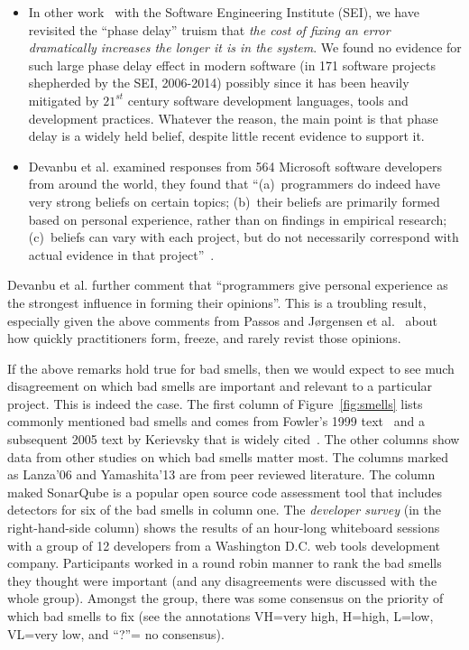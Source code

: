 \documentclass[twocolumn,5p]{elsarticle}
\newcommand{\bi}{\begin{itemize}[leftmargin=0.4cm]}
\newcommand{\ei}{\end{itemize}}
\newcommand{\fig}[1]{Figure~\ref{fig:#1}}
\theoremstyle{break}
\begin{document}
	\bi
	\item
	In other work~\cite{me16phase} with the Software Engineering Institute (SEI), we have revisited
	the ``phase delay'' truism that {\em the cost of fixing an error dramatically increases the longer it is in the system}. 
	We found no evidence for such large   phase delay effect in modern
	software (in 171 software projects shepherded
	by the SEI, 2006-2014) possibly since it has been  heavily mitigated by $21^{st}$ century software development languages, tools and development practices. 
	Whatever the reason, the main point  is that phase delay is a widely
	held belief, despite little recent evidence to support it.
	\item
	Devanbu et al. examined responses from 564 Microsoft software developers from around
	the world, they found that  ``(a)~programmers do indeed have very
	strong beliefs on certain topics; (b)~their beliefs are primarily formed
	based on personal experience, rather than on findings in empirical
	research; (c)~beliefs can vary with each project, but do not necessarily
	correspond with actual evidence in that project''~\cite{prem16}.
	\ei
	Devanbu et al. further  comment that ``programmers give personal experience
	as the strongest influence in forming their opinions''. This is a troubling
	result, especially given the above comments from Passos and  J{\o}rgensen et al.~\cite{passos11,jorgensen09} about how quickly practitioners form, freeze, and rarely revist those opinions.
	
	
	
	
	
	If the above remarks hold true for bad smells, then we would expect
	to see much disagreement on which bad smells are important and relevant
	to  a particular project. This is indeed the case.
	The first column of \fig{smells} 
	lists  commonly mentioned bad smells and comes from Fowler's 1999 text~\cite{fowler99} and a subsequent 2005 text by Kerievsky that is widely cited~\cite{Kerievsky2005}.
	The other
	columns show data from other studies on which bad smells matter most.
	The columns marked as Lanza'06 and Yamashita'13 are from peer reviewed literature. The column maked SonarQube is a popular open source
	code assessment tool that includes detectors for six of the bad smells
	in column one. 
	The {\em developer survey} (in the right-hand-side column) shows the results of an hour-long whiteboard sessions with a group of 12 developers from a Washington
	D.C. web tools development company. Participants
	worked in a round robin manner to rank the bad smells they thought were
	important (and any disagreements were discussed with the whole group).
	Amongst the group, there was  some
	consensus on  the priority of which bad smells to fix
	(see the annotations VH=very high,
	H=high, L=low, VL=very low, and ``?''= no consensus).  
	
\end{document}
